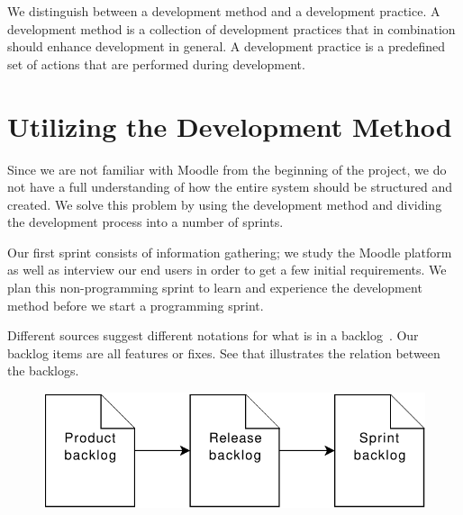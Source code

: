 We distinguish between a development method and a development practice.
A development method is a collection of development practices that in combination should enhance development in general. 
A development practice is a predefined set of actions that are performed during development.



\section{Utilizing the Development Method} %
Since we are not familiar with Moodle from the beginning of the project, we do not have a full understanding of how the entire system should be structured and created.
We solve this problem by using the development method \scrum{} and dividing the development process into a number of sprints.


Our first sprint consists of information gathering; we study the Moodle platform as well as interview our end users in order to get a few initial requirements. 
We plan this non-programming sprint to learn and experience the \scrum{} development method before we start a programming sprint.

Different sources suggest different notations for what is in a backlog~\cite[p.~17]{scrumchecklist}\cite[pp.~123-124]{Larman04}.
Our backlog items are all features or fixes. 
See  that illustrates the relation between the backlogs. 
\begin{figure}%
\center
\includegraphics[scale=0.50]{images/backlogs}%
%
\label{fig:backlog}%
\end{figure}

